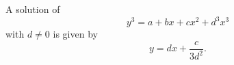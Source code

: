 \begin{proposition}
    A solution of
\[
    y^3=a+bx+cx^2+d^3x^3
\]
    with $d\ne0$ is given by
\[
    y=dx+\frac{c}{3d^2}.
\]
\end{proposition}
